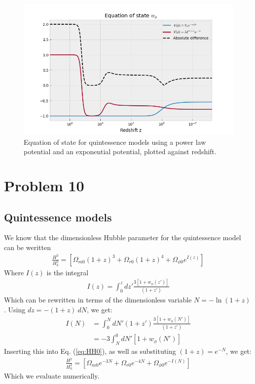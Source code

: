 \documentclass[reprint,english,notitlepage,nofootinbib]{revtex4-1}  %
\numberwithin{equation}{section}
\begin{document}
\begin{figure}[h!]
	\includegraphics[scale=0.45]{eos.png}
	\caption{Equation of state for quintessence models using a power law potential
	and an exponential potential, plotted against redshift.}
	\label{fig:eos}
\end{figure}

\section{Problem 10}
\subsection{Quintessence models}
We know that the dimensionless Hubble parameter for the quintessence model can
be weritten
\begin{align}\label{eq:HH0}
	\frac{H^2}{H_0^2} = \left[ \Omega_{m0}(1+z)^3 + \Omega_{r0}(1+z)^4
											+ \Omega_{\phi 0}e^{I(z)} \right]
\end{align}
Where $I(z)$ is the integral
\begin{align}
	I(z) = \int_0^z dz' \frac{3[1+w_\phi(z')]}{(1+z')}
\end{align}
Which can be rewritten in terms of the dimensionless variable $N=-\ln(1+z)$.
Using $dz = -(1+z)\ dN$, we get:
\begin{align}
	I(N) &= \int^N_0 dN' (1+z')\frac{3[1 + w_\phi(N')]}{(1+z')} \\
			 &= -3\int^0_N dN' [1+w_\phi(N')]
\end{align}
Inserting this into Eq. (\ref{eq:HH0}), as well as substituting
$(1+z)=e^{-N}$, we get:
\begin{align}
	\frac{H^2}{H_0^2} = \left[ \Omega_{m0}e^{-3N} + \Omega_{r0}e^{-4N}
											+ \Omega_{\phi 0}e^{-I(N)} \right]
\end{align}
Which we evaluate numerically.
\end{document}
